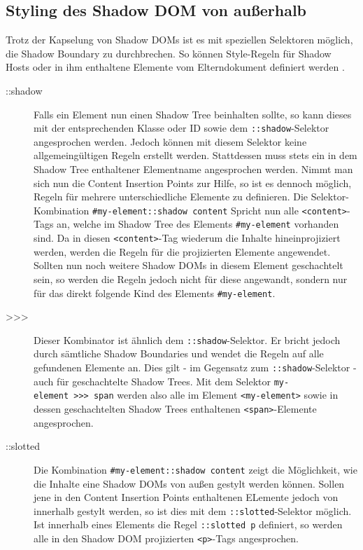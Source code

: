 \subsection{Styling des Shadow DOM von außerhalb}\label{styling-des-shadow-dom-von-ausserhalb}

Trotz der Kapselung von Shadow \ac{DOM}s ist es mit speziellen Selektoren möglich, die Shadow Boundary zu durchbrechen. So können Style-Regeln für Shadow Hosts oder in ihm enthaltene Elemente vom Elterndokument definiert werden \cite{citeulike:13883067}.

\begin{description}
  \item[::shadow] Falls ein Element nun einen Shadow Tree beinhalten sollte, so kann dieses mit der entsprechenden Klasse oder ID sowie dem \texttt{::shadow}-Selektor angesprochen werden. Jedoch können mit diesem Selektor keine allgemeingültigen Regeln erstellt werden. Stattdessen muss stets ein in dem Shadow Tree enthaltener Elementname angesprochen werden. Nimmt man sich nun die Content Insertion Points zur Hilfe, so ist es dennoch möglich, Regeln für mehrere unterschiedliche Elemente zu definieren. Die Selektor-Kombination \texttt{\#my-element::shadow\ content} Spricht nun alle \texttt{\textless{}content\textgreater{}}-Tags an, welche im Shadow Tree des Elements \texttt{\#my-element} vorhanden sind. Da in diesen \texttt{\textless{}content\textgreater{}}-Tag wiederum die Inhalte hineinprojiziert werden, werden die Regeln für die projizierten Elemente angewendet. Sollten nun noch weitere Shadow \ac{DOM}s in diesem Element geschachtelt sein, so werden die Regeln jedoch nicht für diese angewandt, sondern nur für das direkt folgende Kind des Elements \texttt{\#my-element}.
  \item[\textgreater{}\textgreater{}\textgreater{}] Dieser Kombinator ist ähnlich dem \texttt{::shadow}-Selektor. Er bricht jedoch durch sämtliche Shadow Boundaries und wendet die Regeln auf alle gefundenen Elemente an. Dies gilt - im Gegensatz zum \texttt{::shadow}-Selektor - auch für geschachtelte Shadow Trees. Mit dem Selektor \texttt{my-element\ \textgreater{}\textgreater{}\textgreater{}\ span} werden also alle im Element \texttt{\textless{}my-element\textgreater{}} sowie in dessen geschachtelten Shadow Trees enthaltenen \texttt{\textless{}span\textgreater{}}-Elemente angesprochen.
  \item[::slotted] Die Kombination \texttt{\#my-element::shadow\ content} zeigt die Möglichkeit, wie die Inhalte eine Shadow \ac{DOM}s von außen gestylt werden können. Sollen jene in den Content Insertion Points enthaltenen ELemente jedoch von innerhalb gestylt werden, so ist dies mit dem \texttt{::slotted}-Selektor möglich. Ist innerhalb eines Elements die Regel \texttt{::slotted\ p} definiert, so werden alle in den Shadow \ac{DOM} projizierten \texttt{\textless{}p\textgreater{}}-Tags angesprochen.
\end{description}


